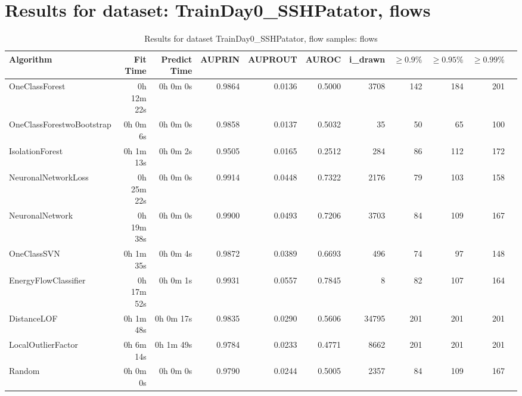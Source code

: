 \documentclass{article}
\begin{document}
\section*{Results for dataset: TrainDay0_SSHPatator, flows}
\begin{table}[h!]
\centering
\caption{Results for dataset TrainDay0_SSHPatator, flow samples: flows}
\begin{tabular}{lrrrrrrrrrr}
\toprule
Algorithm & Fit Time & Predict Time & AUPRIN & AUPROUT & AUROC & i\_drawn & $\geq 0.9\%$ & $\geq 0.95\%$ & $\geq 0.99\%$ \\
\midrule
OneClassForest & 0h 12m 22s & 0h 0m 0s & 0.9864 & 0.0136 & 0.5000 & 3708 & 142 & 184 & 201 \\
OneClassForestwoBootstrap & 0h 0m 6s & 0h 0m 0s & 0.9858 & 0.0137 & 0.5032 & 35 & 50 & 65 & 100 \\
IsolationForest & 0h 1m 13s & 0h 0m 2s & 0.9505 & 0.0165 & 0.2512 & 284 & 86 & 112 & 172 \\
NeuronalNetworkLoss & 0h 25m 22s & 0h 0m 0s & 0.9914 & 0.0448 & 0.7322 & 2176 & 79 & 103 & 158 \\
NeuronalNetwork & 0h 19m 38s & 0h 0m 0s & 0.9900 & 0.0493 & 0.7206 & 3703 & 84 & 109 & 167 \\
OneClassSVN & 0h 1m 35s & 0h 0m 4s & 0.9872 & 0.0389 & 0.6693 & 496 & 74 & 97 & 148 \\
EnergyFlowClassifier & 0h 17m 52s & 0h 0m 1s & 0.9931 & 0.0557 & 0.7845 & 8 & 82 & 107 & 164 \\
DistanceLOF & 0h 1m 48s & 0h 0m 17s & 0.9835 & 0.0290 & 0.5606 & 34795 & 201 & 201 & 201 \\
LocalOutlierFactor & 0h 6m 14s & 0h 1m 49s & 0.9784 & 0.0233 & 0.4771 & 8662 & 201 & 201 & 201 \\
Random & 0h 0m 0s & 0h 0m 0s & 0.9790 & 0.0244 & 0.5005 & 2357 & 84 & 109 & 167 \\
\bottomrule
\end{tabular}
\end{table}
\end{document}
